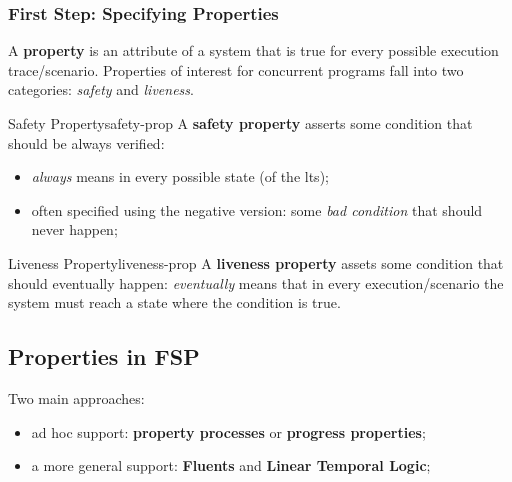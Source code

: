 \subsubsection{First Step: Specifying Properties}\label{sub:an_first_step_specifying_properties} %
A \textbf{property} is an attribute of a system that is true for every possible execution trace/scenario.
Properties of interest for concurrent programs fall into two categories: \textit{safety} and \textit{liveness}.
\begin{definition}{Safety Property}{safety-prop}
    A \textbf{safety property} asserts some condition that should be always verified:
    \begin{itemize}
        \item \textit{always} means in every possible state (of the \ac{lts});
        \item often specified using the negative version: some \textit{bad condition} that should never happen;
    \end{itemize}
\end{definition}
\begin{definition}{Liveness Property}{liveness-prop}
    A \textbf{liveness property} assets some condition that should eventually happen: \textit{eventually} means that in every execution/scenario the system must reach a state where the condition is true.
\end{definition}
%
\subsection{Properties in FSP}\label{sub:an_properties_in_fsp} %
Two main approaches:
\begin{itemize}
    \item ad hoc support: \textbf{property processes} or \textbf{progress properties};
    \item a more general support: \textbf{Fluents} and \textbf{Linear Temporal Logic};
\end{itemize}
%
